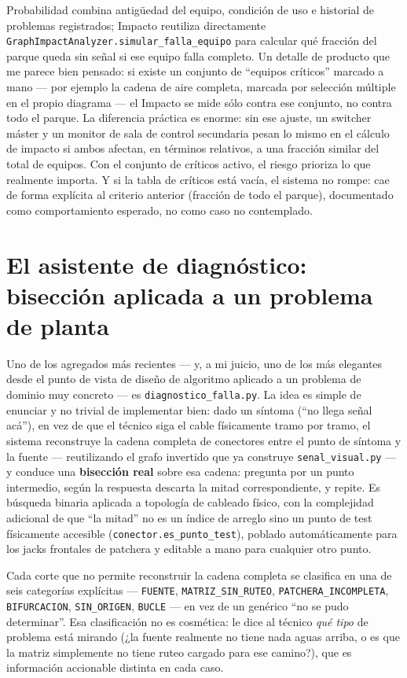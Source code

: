 \documentclass[11pt,twocolumn]{article}
\begin{document}
Probabilidad combina antigüedad del equipo, condición de uso e historial de problemas registrados; Impacto reutiliza directamente \texttt{GraphImpactAnalyzer.simular\_falla\_equipo} para calcular qué fracción del parque queda sin señal si ese equipo falla completo. Un detalle de producto que me parece bien pensado: si existe un conjunto de ``equipos críticos'' marcado a mano --- por ejemplo la cadena de aire completa, marcada por selección múltiple en el propio diagrama --- el Impacto se mide sólo contra ese conjunto, no contra todo el parque. La diferencia práctica es enorme: sin ese ajuste, un switcher máster y un monitor de sala de control secundaria pesan lo mismo en el cálculo de impacto si ambos afectan, en términos relativos, a una fracción similar del total de equipos. Con el conjunto de críticos activo, el riesgo prioriza lo que realmente importa. Y si la tabla de críticos está vacía, el sistema no rompe: cae de forma explícita al criterio anterior (fracción de todo el parque), documentado como comportamiento esperado, no como caso no contemplado.

\section{El asistente de diagnóstico: bisección aplicada a un problema de planta}

Uno de los agregados más recientes --- y, a mi juicio, uno de los más elegantes desde el punto de vista de diseño de algoritmo aplicado a un problema de dominio muy concreto --- es \texttt{diagnostico\_falla.py}. La idea es simple de enunciar y no trivial de implementar bien: dado un síntoma (``no llega señal acá''), en vez de que el técnico siga el cable físicamente tramo por tramo, el sistema reconstruye la cadena completa de conectores entre el punto de síntoma y la fuente --- reutilizando el grafo invertido que ya construye \texttt{senal\_visual.py} --- y conduce una \textbf{bisección real} sobre esa cadena: pregunta por un punto intermedio, según la respuesta descarta la mitad correspondiente, y repite. Es búsqueda binaria aplicada a topología de cableado físico, con la complejidad adicional de que ``la mitad'' no es un índice de arreglo sino un punto de test físicamente accesible (\texttt{conector.es\_punto\_test}), poblado automáticamente para los jacks frontales de patchera y editable a mano para cualquier otro punto.

Cada corte que no permite reconstruir la cadena completa se clasifica en una de seis categorías explícitas --- \texttt{FUENTE}, \texttt{MATRIZ\_SIN\_RUTEO}, \texttt{PATCHERA\_INCOMPLETA}, \texttt{BIFURCACION}, \texttt{SIN\_ORIGEN}, \texttt{BUCLE} --- en vez de un genérico ``no se pudo determinar''. Esa clasificación no es cosmética: le dice al técnico \emph{qué tipo} de problema está mirando (¿la fuente realmente no tiene nada aguas arriba, o es que la matriz simplemente no tiene ruteo cargado para ese camino?), que es información accionable distinta en cada caso.
\end{document}
